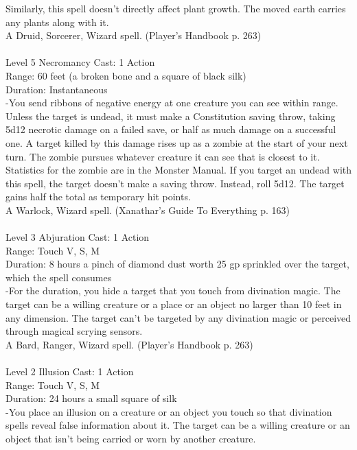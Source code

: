\documentclass[10pt,twocolumn]{report}
\begin{document}
Similarly, this spell doesn’t directly affect plant growth. The moved earth carries any plants along with it.\\
A Druid, Sorcerer, Wizard spell. (Player's Handbook p. 263) \\


 \\
Level 5 \quad Necromancy \quad Cast: 1 Action\\
Range: 60 feet \quad (a broken bone and a square of black silk)\\
Duration: Instantaneous \quad \\
-You send ribbons of negative energy at one creature you can see within range. Unless the target is undead, it must make a Constitution saving throw, taking 5d12 necrotic damage on a failed save, or half as much damage on a successful one. A target killed by this damage rises up as a zombie at the start of your next turn. The zombie pursues whatever creature it can see that is closest to it. Statistics for the zombie are in the Monster Manual. If you target an undead with this spell, the target doesn’t make a saving throw. Instead, roll 5d12. The target gains half the total as temporary hit points.\\
A Warlock, Wizard spell. (Xanathar's Guide To Everything p. 163) \\


 \\
Level 3 \quad Abjuration \quad Cast: 1 Action\\
Range: Touch \quad V, S, M\\
Duration: 8 hours \quad a pinch of diamond dust worth 25 gp sprinkled over the target, which the spell consumes\\
-For the duration, you hide a target that you touch from divination magic.
The target can be a willing creature or a place or an object no larger than 10 feet in any dimension. The target can’t be targeted by any divination magic or perceived through magical scrying sensors.\\
A Bard, Ranger, Wizard spell. (Player's Handbook p. 263) \\


 \\
Level 2 \quad Illusion \quad Cast: 1 Action\\
Range: Touch \quad V, S, M\\
Duration: 24 hours \quad a small square of silk\\
-You place an illusion on a creature or an object you touch so that divination spells reveal false information about it.
The target can be a willing creature or an object that isn’t being carried or worn by another creature.
\end{document}
